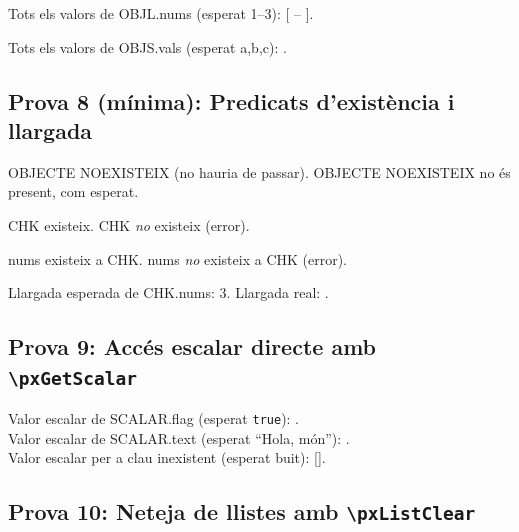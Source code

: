 \documentclass[fake,cover-config=offset,default]{P3CTeX}
\begin{document}

	Tots els valors de OBJL.nums (esperat 1--3): [ -- ].

	\bigskip


	Tots els valors de OBJS.vals (esperat a,b,c): .

	\bigskip

	\subsection{Prova 8 (mínima): Predicats d'existència i llargada}

	{OBJECTE NOEXISTEIX (no hauria de passar).}
	{OBJECTE NOEXISTEIX no és present, com esperat.}


	{CHK existeix.}
	{CHK \emph{no} existeix (error).}

	{nums existeix a CHK.}
	{nums \emph{no} existeix a CHK (error).}

	Llargada esperada de CHK.nums: 3.\quad
	Llargada real: .

	\bigskip

	\subsection{Prova 9: Accés escalar directe amb \texttt{\textbackslash pxGetScalar}}


	Valor escalar de SCALAR.flag (esperat \texttt{true}): .\\
	Valor escalar de SCALAR.text (esperat ``Hola, món''): .\\
	Valor escalar per a clau inexistent (esperat buit): [].

	\bigskip

	\subsection{Prova 10: Neteja de llistes amb \texttt{\textbackslash pxListClear}}
\end{document}
